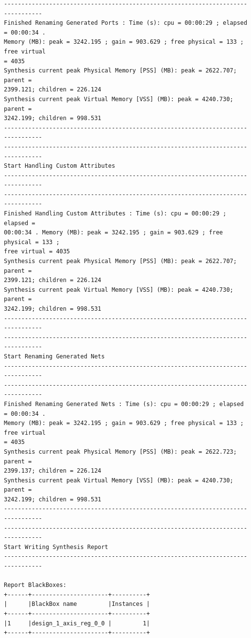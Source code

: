 \documentclass{article}
\begin{document}
\begin{lstlisting}
---------------------------------------------------------------------------------
Finished Renaming Generated Ports : Time (s): cpu = 00:00:29 ; elapsed = 00:00:34 . 
Memory (MB): peak = 3242.195 ; gain = 903.629 ; free physical = 133 ; free virtual 
= 4035
Synthesis current peak Physical Memory [PSS] (MB): peak = 2622.707; parent = 
2399.121; children = 226.124
Synthesis current peak Virtual Memory [VSS] (MB): peak = 4240.730; parent = 
3242.199; children = 998.531
---------------------------------------------------------------------------------
---------------------------------------------------------------------------------
Start Handling Custom Attributes
---------------------------------------------------------------------------------
---------------------------------------------------------------------------------
Finished Handling Custom Attributes : Time (s): cpu = 00:00:29 ; elapsed = 
00:00:34 . Memory (MB): peak = 3242.195 ; gain = 903.629 ; free physical = 133 ; 
free virtual = 4035
Synthesis current peak Physical Memory [PSS] (MB): peak = 2622.707; parent = 
2399.121; children = 226.124
Synthesis current peak Virtual Memory [VSS] (MB): peak = 4240.730; parent = 
3242.199; children = 998.531
---------------------------------------------------------------------------------
---------------------------------------------------------------------------------
Start Renaming Generated Nets
---------------------------------------------------------------------------------
---------------------------------------------------------------------------------
Finished Renaming Generated Nets : Time (s): cpu = 00:00:29 ; elapsed = 00:00:34 . 
Memory (MB): peak = 3242.195 ; gain = 903.629 ; free physical = 133 ; free virtual 
= 4035
Synthesis current peak Physical Memory [PSS] (MB): peak = 2622.723; parent = 
2399.137; children = 226.124
Synthesis current peak Virtual Memory [VSS] (MB): peak = 4240.730; parent = 
3242.199; children = 998.531
---------------------------------------------------------------------------------
---------------------------------------------------------------------------------
Start Writing Synthesis Report
---------------------------------------------------------------------------------

Report BlackBoxes: 
+------+----------------------+----------+
|      |BlackBox name         |Instances |
+------+----------------------+----------+
|1     |design_1_axis_reg_0_0 |         1|
+------+----------------------+----------+


\end{lstlisting}
\end{document}
